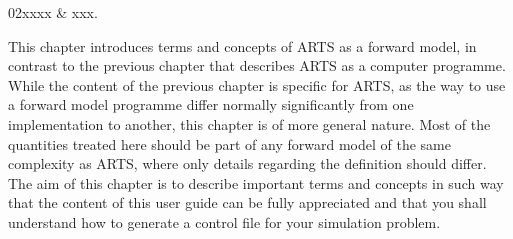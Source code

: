 %
%
 \label{sec:fm_defs}

%
%
\starthistory
  02xxxx & xxx.\\
\stophistory

This chapter introduces terms and concepts of ARTS as a forward model,
in contrast to the previous chapter that describes ARTS as a computer
programme. While the content of the previous chapter is specific for
ARTS, as the way to use a forward model programme differ normally
significantly from one implementation to another, this chapter is of
more general nature. Most of the quantities treated here should be
part of any forward model of the same complexity as ARTS, where only
details regarding the definition should differ. The aim of this chapter
is to describe important terms and concepts in such way that the 
content of this user guide can be fully appreciated and that you shall
understand how to generate a control file for your simulation problem. 




\label{sec:fm_defs:atmosphere}


